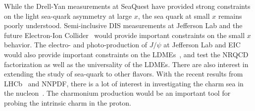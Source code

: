 \documentclass[../main.tex]{subfiles}
\begin{document}
While the Drell-Yan measurements at SeaQuest have provided strong constraints on the light sea-quark
asymmetry at large $x$, the sea quark at small $x$ remains poorly understood.
Semi-inclusive DIS measurements at Jefferson Lab and the future Electron-Ion Collider~\cite{abdulkhalek2022}
would provide important constraints on the small $x$ behavior. 
The electro- and photo-production of $J/\psi$ at Jefferson Lab and EIC would also provide important
constraints on the LDMEs~\cite{qiu2021}, and test the NRQCD factorization as well as the universality of the LDMEs. 
There are also interest in extending the study of sea-quark to other flavors. 
With the recent results from LHCb~\cite{aaij2022} and NNPDF\cite{ball2022},
there is a lot of interest in investigating the charm sea in the nucleon~\cite{vogt2021,vogt2023}.
The charmonium production would be an important tool for probing the intrinsic charm in the proton.

\ifSubfilesClassLoaded{ \printbibliography[heading=bibintoc,title={References}]}{}
\end{document}
